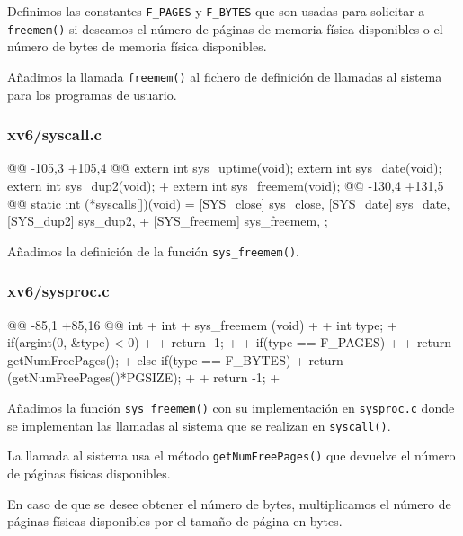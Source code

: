 \par Definimos las constantes \texttt{F\_PAGES} y \texttt{F\_BYTES} que
son usadas para solicitar a \texttt{freemem()} si deseamos el número de páginas de memoria física
disponibles o el número de bytes de memoria física disponibles.

\par Añadimos la llamada \texttt{freemem()} al fichero de definición de llamadas 
al sistema para los programas de usuario.


\subsubsection{xv6/syscall.c}
\begin{listing}
@@ -105,3 +105,4 @@
    extern int sys_uptime(void);
    extern int sys_date(void);
    extern int sys_dup2(void);
+   extern int sys_freemem(void);
@@ -130,4 +131,5 @@ static int (*syscalls[])(void) = {
    [SYS_close]   sys_close,
    [SYS_date]    sys_date,
    [SYS_dup2]    sys_dup2,
+   [SYS_freemem] sys_freemem,
    };
\end{listing}
\par Añadimos la definición de la función \texttt{sys\_freemem()}.
\newpage
\subsubsection{xv6/sysproc.c}
\begin{listing}
@@ -85,1 +85,16 @@ int
+   int 
+   sys_freemem (void)
+   {
+       int type;
+       if(argint(0, &type) < 0)
+       {
+           return -1;
+       }
+       if(type == F_PAGES)
+       {
+           return getNumFreePages();
+       }else if(type == F_BYTES){
+           return (getNumFreePages()*PGSIZE);
+       }
+       return -1;
+   }
\end{listing}
\par Añadimos la función \texttt{sys\_freemem()} con su implementación en \texttt{sysproc.c}
donde se implementan las llamadas al sistema que se realizan en \texttt{syscall()}.

\par La llamada al sistema usa el método \texttt{getNumFreePages()} que
devuelve el número de páginas físicas disponibles.

\par En caso de que se desee obtener el número de bytes, multiplicamos el número de páginas físicas disponibles
por el tamaño de página en bytes.

